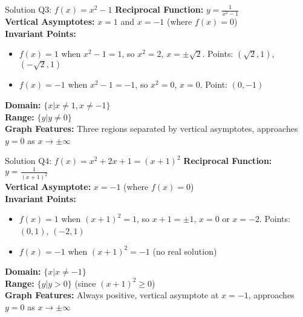 \documentclass[aspectratio=169]{beamer}
\begin{document}
\begin{frame}{Solution Q3: $f(x) = x^2 - 1$}
    \footnotesize
    \textbf{Reciprocal Function:} $y = \frac{1}{x^2 - 1}$\\
    \vspace{0.5em}
    \textbf{Vertical Asymptotes:} $x = 1$ and $x = -1$ (where $f(x) = 0$)\\
    \vspace{0.5em}
    \textbf{Invariant Points:}
    \begin{itemize}
        \item $f(x) = 1$ when $x^2 - 1 = 1$, so $x^2 = 2$, $x = \pm\sqrt{2}$. Points: $(\sqrt{2}, 1)$, $(-\sqrt{2}, 1)$
        \item $f(x) = -1$ when $x^2 - 1 = -1$, so $x^2 = 0$, $x = 0$. Point: $(0, -1)$
    \end{itemize}
    \vspace{0.5em}
    \textbf{Domain:} $\{x | x \neq 1, x \neq -1\}$\\
    \textbf{Range:} $\{y | y \neq 0\}$\\
    \vspace{0.5em}
    \textbf{Graph Features:} Three regions separated by vertical asymptotes, approaches $y = 0$ as $x \to \pm\infty$
\end{frame}

\begin{frame}{Solution Q4: $f(x) = x^2 + 2x + 1 = (x + 1)^2$}
    \footnotesize
    \textbf{Reciprocal Function:} $y = \frac{1}{(x + 1)^2}$\\
    \vspace{0.5em}
    \textbf{Vertical Asymptote:} $x = -1$ (where $f(x) = 0$)\\
    \vspace{0.5em}
    \textbf{Invariant Points:}
    \begin{itemize}
        \item $f(x) = 1$ when $(x + 1)^2 = 1$, so $x + 1 = \pm 1$, $x = 0$ or $x = -2$. Points: $(0, 1)$, $(-2, 1)$
        \item $f(x) = -1$ when $(x + 1)^2 = -1$ (no real solution)
    \end{itemize}
    \vspace{0.5em}
    \textbf{Domain:} $\{x | x \neq -1\}$\\
    \textbf{Range:} $\{y | y > 0\}$ (since $(x + 1)^2 \geq 0$)\\
    \vspace{0.5em}
    \textbf{Graph Features:} Always positive, vertical asymptote at $x = -1$, approaches $y = 0$ as $x \to \pm\infty$
\end{frame}
\end{document}
